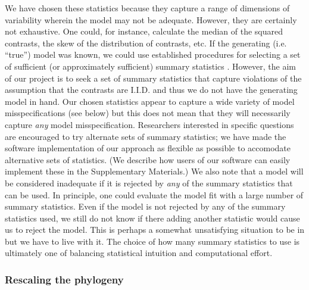 \documentclass[12pt]{article}
\begin{document}
We have chosen these statistics because they capture a range of dimensions of variability wherein the model may not be adequate. However, they are certainly not exhaustive. One could, for instance, calculate the median of the squared contrasts, the skew of the distribution of contrasts, etc. If the generating (i.e. ``true'') model was known, we could use established procedures for selecting a set of sufficient (or approximately sufficient) summary statistics \citep[e.g.][]{MajoramJoyce, Wegmann2010}. However, the aim of our project is to seek a set of summary statistics that capture violations of the assumption that the contrasts are I.I.D. and thus we do not have the generating model in hand. Our chosen statistics appear to capture a wide variety of model misspecifications (see below) but this does not mean that they will necessarily capture \textit{any} model misspecification. Researchers interested in specific questions are encouraged to try alternate sets of summary statistics; we have made the software implementation of our approach as flexible as possible to accomodate alternative sets of statistics. (We describe how users of our software can easily implement these in the Supplementary Materials.) We also note that a model will be considered inadequate if it is rejected by \textit{any} of the summary statistics that can be used. In principle, one could evaluate the model fit with a large number of summary statistics. Even if the model is not rejected by any of the summary statistics used, we still do not know if there adding another statistic would cause us to reject the model. This is perhaps a somewhat unsatisfying situation to be in but we have to live with it. The choice of how many summary statistics to use is ultimately one of balancing statistical intuition and computational effort. 

\subsubsection{Rescaling the phylogeny}
\end{document}
